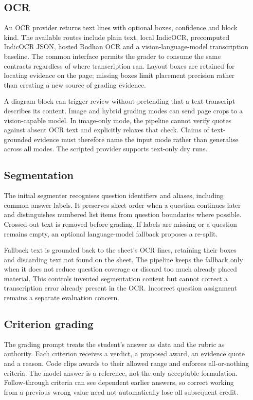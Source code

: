 \subsection{OCR}
An OCR provider returns text lines with optional boxes, confidence and block kind. The available routes include plain text, local IndicOCR, precomputed IndicOCR JSON, hosted Bodhan OCR and a vision-language-model transcription baseline. The common interface permits the grader to consume the same contracts regardless of where transcription ran. Layout boxes are retained for locating evidence on the page; missing boxes limit placement precision rather than creating a new source of grading evidence.

A diagram block can trigger review without pretending that a text transcript describes its content. Image and hybrid grading modes can send page crops to a vision-capable model. In image-only mode, the pipeline cannot verify quotes against absent OCR text and explicitly relaxes that check. Claims of text-grounded evidence must therefore name the input mode rather than generalise across all modes. The scripted provider supports text-only dry runs.

\subsection{Segmentation}
The initial segmenter recognises question identifiers and aliases, including common answer labels. It preserves sheet order when a question continues later and distinguishes numbered list items from question boundaries where possible. Crossed-out text is removed before grading. If labels are missing or a question remains empty, an optional language-model fallback proposes a re-split.

Fallback text is grounded back to the sheet's OCR lines, retaining their boxes and discarding text not found on the sheet. The pipeline keeps the fallback only when it does not reduce question coverage or discard too much already placed material. This controls invented segmentation content but cannot correct a transcription error already present in the OCR. Incorrect question assignment remains a separate evaluation concern.

\subsection{Criterion grading}
The grading prompt treats the student's answer as data and the rubric as authority. Each criterion receives a verdict, a proposed award, an evidence quote and a reason. Code clips awards to their allowed range and enforces all-or-nothing criteria. The model answer is a reference, not the only acceptable formulation. Follow-through criteria can see dependent earlier answers, so correct working from a previous wrong value need not automatically lose all subsequent credit.

